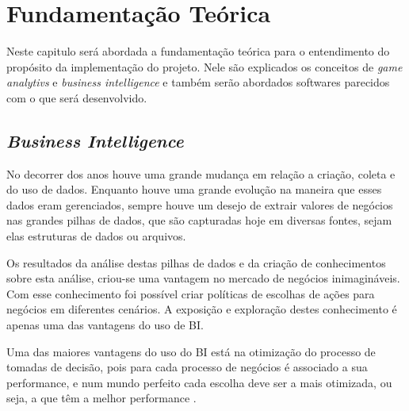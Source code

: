 \chapter[Fundamentação Teórica]{Fundamentação Teórica}
Neste capitulo será abordada a fundamentação teórica para o entendimento do propósito da implementação do projeto. Nele são explicados os conceitos de \textit{game analytivs} e \textit{business intelligence} e também serão abordados softwares parecidos com o que será desenvolvido.
\section{\textit{Business Intelligence}}
No decorrer dos anos houve uma grande mudança em relação a criação, coleta e do uso de dados. Enquanto houve uma grande evolução na maneira que esses dados eram gerenciados, sempre houve um desejo de extrair valores de negócios nas grandes pilhas de dados, que são capturadas hoje em diversas fontes, sejam elas estruturas de dados ou arquivos.

Os resultados da análise destas pilhas de dados e da criação de conhecimentos sobre esta análise, criou-se uma vantagem no mercado de negócios inimagináveis. Com esse conhecimento foi possível criar políticas de escolhas de ações para negócios em diferentes cenários. A exposição e exploração destes conhecimento é apenas uma das vantagens do uso de BI.

Uma das maiores vantagens do uso do BI está na otimização do processo de tomadas de decisão, pois para cada processo de negócios é associado a sua performance, e num mundo perfeito cada escolha deve ser a mais otimizada, ou seja, a que têm a melhor performance \cite{business_intelligence}.

